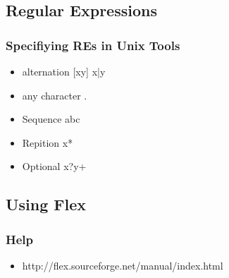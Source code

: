 \documentclass[usepdftitle=false,professionalfonts,compress ]{beamer}
\begin{document}
\subsection{Regular Expressions}

{
\begin{frame}\frametitle{Specifiying REs in Unix Tools}

	\begin{itemize}
	\item alternation [xy] x|y
			\item any character .
			\item Sequence abc
			\item Repition x*
			\item Optional x?y+
				\end{itemize}

\end{frame}}







\subsection{Using Flex}

{
\begin{frame}\frametitle{Help}

	\begin{itemize}
	\item http://flex.sourceforge.net/manual/index.html
				\end{itemize}

\end{frame}}
\end{document}
